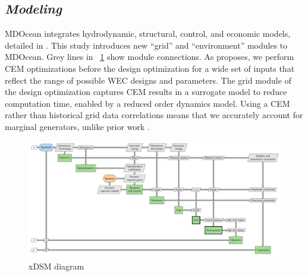 \documentclass[10pt,twoside]{article}
\newif\ifplaceholder
\let\originalincludegraphics\includegraphics
\renewcommand{\includegraphics}[2][]{%
  \ifplaceholder
    \begin{tikzpicture}
      \node[anchor=south west, inner sep=0] (img) at (0,0) {\originalincludegraphics[#1]{#2}};
      \node at ($(img.south east)!0.5!(img.north west)$)
        [fill=white,opacity=0.8,text=red,font=\huge] {Placeholder};
    \end{tikzpicture}
    \vspace{-\baselineskip}
  \else
    \originalincludegraphics[#1]{#2}%
  \fi
  \placeholderfalse %
}
\begin{document}
\subsection{\textit{Modeling}}
MDOcean integrates hydrodynamic, structural, control, and economic models, detailed in \cite{mccabe_leveraging_2025}.
This study introduces new ``grid'' and ``environment'' modules to MDOcean.
Grey lines in \figureautorefname~\ref{fig:n2} show module connections.
As \cite{mccabe_system_2023} proposes, we perform CEM optimizations before the design optimization for a wide set of inputs that reflect the range of possible WEC designs and parameters. The grid module of the design optimization captures CEM results in a surrogate model to reduce computation time, enabled by a reduced order dynamics model.
Using a CEM rather than historical grid data correlations means that we accurately account for marginal generators, unlike prior work \cite{canet_eco-conscious_2023,kainz_how_2024}.
\begin{figure}[hbtp]
    \centering
    \includegraphics[width=.77\textwidth]{figures/out/xdsm_grid.pdf}
    \caption{xDSM diagram}
    \label{fig:n2}
\end{figure}

\clearpage
\end{document}
